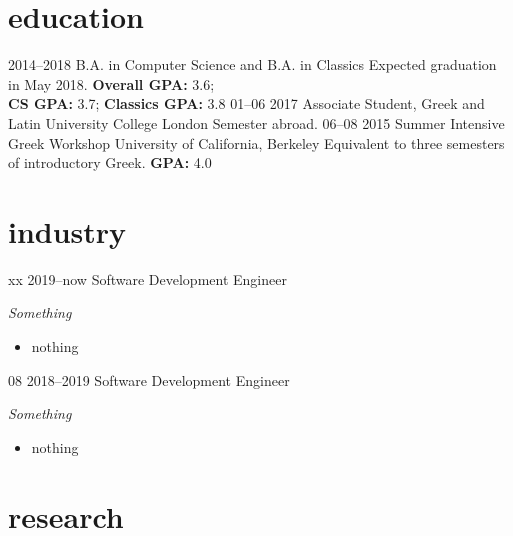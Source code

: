 \documentclass[]{friggeri-cv}
\begin{document}
\section{education}

\begin{entrylist}
  \entry
    {2014--2018}
    {B.A. in Computer Science and B.A. in Classics}
    {}
    {Expected graduation in May 2018. \textbf{Overall GPA:} 3.6; \\ \textbf{CS GPA:} 3.7; \textbf{Classics GPA:} 3.8}
  \entry
    {01--06 2017}
    {Associate Student, Greek and Latin}
    {University College London}
    {Semester abroad.}
  \entry
    {06--08 2015}
    {Summer Intensive Greek Workshop}
    {University of California, Berkeley}
    {Equivalent to three semesters of introductory Greek. \textbf{GPA:} 4.0}
\end{entrylist}

\section{industry}

\begin{entrylist}
  \entry
    {xx 2019--now}
    {Software Development Engineer}
    {\AlexaAuto}
    {\emph{Something}
    \begin{itemize}
    \item nothing
    \end{itemize}
    }
  \entry
    {08 2018--2019}
    {Software Development Engineer}
    {\AlexaAuto}
    {\emph{Something}
    \begin{itemize}
    \item nothing
    \end{itemize}
    }
    
\end{entrylist}

\section{research}
\end{document}
